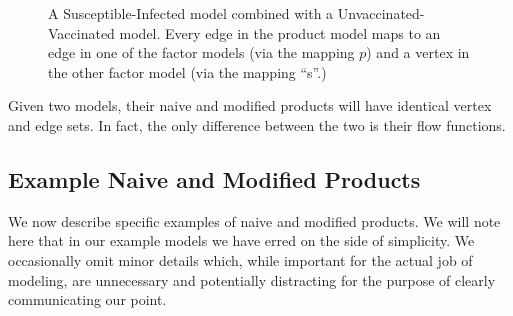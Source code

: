 \documentclass[pdflatex,sn-basic]{sn-jnl}%
\theoremstyle{definition}
\newcommand{\df}[1]{{\color{orange} DF: #1}}
\newcommand{\jd}[1]{{\color{blue} JD: #1}}
\providecommand{\DIFdelbegin}{} %
\providecommand{\DIFdelend}{} %
\newcommand{\DIFscaledelfig}{0.5}
\newlength{\DIFdelgraphicswidth} %
\newlength{\DIFdelgraphicsheight} %
\newcommand{\DIFdelincludegraphics}[2][]{%
\sbox{\DIFdelgraphicsbox}{\DIFOincludegraphics[#1]{#2}}%
\settoboxwidth{\DIFdelgraphicswidth}{\DIFdelgraphicsbox} %
\settoboxtotalheight{\DIFdelgraphicsheight}{\DIFdelgraphicsbox} %
\scalebox{\DIFscaledelfig}{%
\parbox[b]{\DIFdelgraphicswidth}{\usebox{\DIFdelgraphicsbox}\\[-\baselineskip] \rule{\DIFdelgraphicswidth}{0em}}\llap{\resizebox{\DIFdelgraphicswidth}{\DIFdelgraphicsheight}{%
\setlength{\unitlength}{\DIFdelgraphicswidth}%
\begin{picture}(1,1)%
\thicklines\linethickness{2pt} %
{\color[rgb]{1,0,0}\put(0,0){\framebox(1,1){}}}%
{\color[rgb]{1,0,0}\put(0,0){\line( 1,1){1}}}%
{\color[rgb]{1,0,0}\put(0,1){\line(1,-1){1}}}%
\end{picture}%
}\hspace*{3pt}}} %
} %
\DeclareRobustCommand{\DIFdelbegin}{\DIFOdelbegin \let\includegraphics\DIFdelincludegraphics} %
\DeclareRobustCommand{\DIFdelend}{\DIFOaddend \let\includegraphics\DIFOincludegraphics} %
\begin{document}
\DIFdelbegin %

\DIFdelend \begin{figure}
    \centering
    
    \caption{A Susceptible-Infected model combined with a Unvaccinated-Vaccinated model. Every edge in the product model maps to an edge in one of the factor models (via the mapping $p$) and a vertex in the other factor model (via the mapping ``s''.)
    }
    \label{fig:spexplanation}
\end{figure}

\FloatBarrier

Given two models, their naive and modified products will have identical vertex and edge sets. In fact, the only difference between the two is their flow functions. 

\subsection{Example Naive and Modified Products}

We now describe specific examples of naive and modified products. We will note here that in our example models we have erred on the side of simplicity. We occasionally omit minor details which, while important for the actual job of modeling, are unnecessary and potentially distracting for the purpose of clearly communicating our point.  
\end{document}
